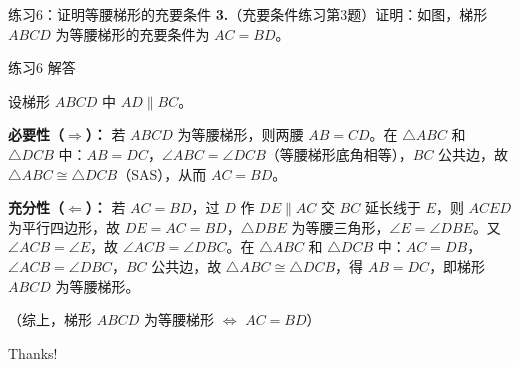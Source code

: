 \documentclass[10pt,aspectratio=169,serif]{beamer}
\begin{document}
\begin{frame}[t]{练习6：证明等腰梯形的充要条件}
\textbf{3.}（充要条件练习第3题）证明：如图，梯形 $ABCD$ 为等腰梯形的充要条件为 $AC=BD$。

\vspace{0.5em}
\begin{center}
\end{center}
\end{frame}

\begin{frame}[t]{练习6 解答}
\begin{tcolorbox}[colback=orange!10,colframe=orange,title=\textbf{证明：充分性与必要性}]
设梯形 $ABCD$ 中 $AD\parallel BC$。

\textbf{必要性（$\Rightarrow$）：} 若 $ABCD$ 为等腰梯形，则两腰 $AB=CD$。在 $\triangle ABC$ 和 $\triangle DCB$ 中：$AB=DC$，$\angle ABC=\angle DCB$（等腰梯形底角相等），$BC$ 公共边，故 $\triangle ABC\cong\triangle DCB$（SAS），从而 $AC=BD$。

\textbf{充分性（$\Leftarrow$）：} 若 $AC=BD$，过 $D$ 作 $DE\parallel AC$ 交 $BC$ 延长线于 $E$，则 $ACED$ 为平行四边形，故 $DE=AC=BD$，$\triangle DBE$ 为等腰三角形，$\angle E=\angle DBE$。又 $\angle ACB=\angle E$，故 $\angle ACB=\angle DBC$。在 $\triangle ABC$ 和 $\triangle DCB$ 中：$AC=DB$，$\angle ACB=\angle DBC$，$BC$ 公共边，故 $\triangle ABC\cong\triangle DCB$，得 $AB=DC$，即梯形 $ABCD$ 为等腰梯形。

\vspace{0.3em}
\small（综上，梯形 $ABCD$ 为等腰梯形 $\Longleftrightarrow$ $AC=BD$）
\end{tcolorbox}
\end{frame}

\begin{frame}[c]
  \begin{center}
    {\Huge\calligra Thanks!}
  \end{center}
\end{frame}
\end{document}
